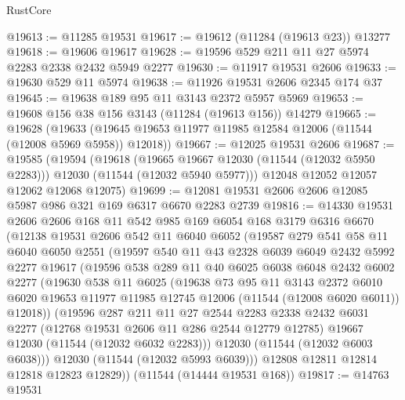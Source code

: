 \begin{lexlean}{RustCore}
\begin{coremodule}
@19613 := @11285 @19531
@19617 := @19612 (@11284 (@19613 @23)) @13277
@19618 := @19606 @19617
@19628 := @19596 @529 @211 @11 @27 @5974 @2283 @2338 @2432 @5949 @2277
@19630 := @11917 @19531 @2606
@19633 := @19630 @529 @11 @5974
@19638 := @11926 @19531 @2606 @2345 @174 @37
@19645 := @19638 @189 @95 @11 @3143 @2372 @5957 @5969
@19653 := @19608 @156 @38 @156 @3143 (@11284 (@19613 @156)) @14279
@19665 := @19628
    (@19633 (@19645 @19653 @11977 @11985 @12584 @12006 (@11544 (@12008 @5969 @5958)) @12018))
@19667 := @12025 @19531 @2606
@19687 := @19585
    (@19594
      (@19618
        (@19665 @19667 @12030 (@11544 (@12032 @5950 @2283)))
        @12030
        (@11544 (@12032 @5940 @5977)))
      @12048
      @12052
      @12057
      @12062
      @12068
      @12075)
@19699 := @12081 @19531 @2606 @2606 @12085 @5987 @986 @321 @169 @6317 @6670 @2283 @2739
@19816 := @14330
    @19531
    @2606
    @2606
    @168
    @11
    @542
    @985
    @169
    @6054
    @168
    @3179
    @6316
    @6670
    (@12138
      @19531
      @2606
      @542
      @11
      @6040
      @6052
      (@19587
        @279
        @541
        @58
        @11
        @6040
        @6050
        @2551
        (@19597
          @540
          @11
          @43
          @2328
          @6039
          @6049
          @2432
          @5992
          @2277
          @19617
          (@19596
            @538
            @289
            @11
            @40
            @6025
            @6038
            @6048
            @2432
            @6002
            @2277
            (@19630
              @538
              @11
              @6025
              (@19638
                @73
                @95
                @11
                @3143
                @2372
                @6010
                @6020
                @19653
                @11977
                @11985
                @12745
                @12006
                (@11544 (@12008 @6020 @6011))
                @12018))
            (@19596
              @287
              @211
              @11
              @27
              @2544
              @2283
              @2338
              @2432
              @6031
              @2277
              (@12768 @19531 @2606 @11 @286 @2544 @12779 @12785)
              @19667
              @12030
              (@11544 (@12032 @6032 @2283)))
            @12030
            (@11544 (@12032 @6003 @6038)))
          @12030
          (@11544 (@12032 @5993 @6039)))
        @12808
        @12811
        @12814
        @12818
        @12823
        @12829))
    (@11544 (@14444 @19531 @168))
@19817 := @14763 @19531

\end{coremodule}
\end{lexlean}
